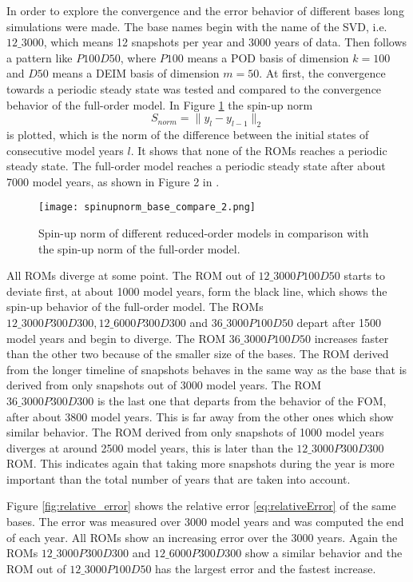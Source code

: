 In order to explore the convergence and the error behavior of different bases long simulations were made. 
The base names begin with the name of the SVD, i.e. $12\_3000$, which means 12 snapshots per year and 3000 years of data. Then follows a pattern like $P100D50$, where $P100$ means a POD basis of dimension $k=100$ and $D50$ means a DEIM basis of dimension  $m=50$.
At first, the convergence towards a periodic steady state was tested and compared to the convergence behavior of the full-order model.
In Figure \ref{fig:spinup} the spin-up norm 
\begin{equation}\label{eq:spinupnorm}
 S_{norm} = \parallel y_l - y_{l-1} \parallel_2 
\end{equation}
is plotted, which is the norm of the difference between the initial states of consecutive model years $l$.
It shows that none of the ROMs reaches a periodic steady state.
The full-order model reaches a periodic steady state after about 7000 model years, as shown in Figure 2 in \cite{metos3dsimpack}.


\begin{figure}[H]
\centering
  \texttt{[image: spinupnorm\_base\_compare\_2.png]}
  \caption{Spin-up norm of different reduced-order models in comparison with the spin-up norm of the full-order model.}
  \label{fig:spinup}
\end{figure}
All ROMs diverge at some point. The ROM out of $12\_3000P100D50$ starts to deviate first, at about 1000 model years, form the black line, which
shows the spin-up behavior of the full-order model. The ROMs $12\_3000P300D300, 12\_6000P300D300$ and $36\_3000P100D50$ depart after 1500 model years and
begin to diverge. The ROM $36\_3000P100D50$ increases faster than the other two because of the smaller size of the bases. The ROM derived 
from the longer timeline of snapshots behaves in the same way as the base that is derived from only snapshots out of 3000 model years.
The ROM $36\_3000P300D300$ is the last one that departs from the behavior of the FOM, after about 3800 model years. This is far away from the other ones which show similar behavior.  
The ROM derived from only snapshots of 1000 model years diverges at around 2500 model years, this is later than the $12\_3000P300D300$ ROM. This indicates again that taking more snapshots during the year is more important than the total number of years 
that are taken into account.


Figure \ref{fig:relative_error} shows the relative error \eqref{eq:relativeError} of the same bases. The error was measured over 3000 model years and was computed the end of each year.
All ROMs show an increasing error over the 3000 years. Again the ROMs $12\_3000P300D300$ and $12\_6000P300D300$ show a similar behavior and the ROM out of $12\_3000P100D50$ has the largest error and the fastest increase.


